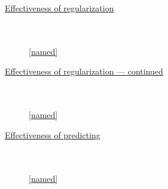 \documentclass{beamer}
\begin{document}
\begin{frame}[plain]
		\centering
		\underline{Effectiveness of regularization}
		\vspace{-1cm}
\begin{figure}[!t]
  \captionsetup[subfloat]{position=top,labelformat=empty}
  \centering
    \subfloat[]{  \resizebox{0.4\textwidth}{!}{}}
    \subfloat[]{  \resizebox{0.4\textwidth}{!}{}}\\
  \vspace{-1cm}
    \subfloat[]{  \resizebox{0.4\textwidth}{!}{}}
    \subfloat[]{  \resizebox{0.4\textwidth}{!}{}}\\
    \ref{named}
\end{figure}
\end{frame}


\begin{frame}[plain]
		\centering
		\underline{Effectiveness of regularization --- continued}
		\vspace{-1cm}
\begin{figure}[!t]
  \captionsetup[subfloat]{position=top,labelformat=empty}
  \centering
    \subfloat[]{  \resizebox{0.4\textwidth}{!}{}}
    \subfloat[]{  \resizebox{0.4\textwidth}{!}{}}\\
  \vspace{-1cm}
    \subfloat[]{  \resizebox{0.4\textwidth}{!}{}}
  \\
    \ref{named}
\end{figure}
\end{frame}


\begin{frame}[plain]
		\centering
		\underline{Effectiveness of predicting}
		\vspace{-1cm}
\begin{figure}[!t]
  \captionsetup[subfloat]{position=top,labelformat=empty}
  \centering
    \subfloat[]{  \resizebox{0.4\textwidth}{!}{}}
    \subfloat[]{  \resizebox{0.4\textwidth}{!}{}}\\
  \vspace{-1cm}
    \subfloat[]{  \resizebox{0.4\textwidth}{!}{}}
    \subfloat[]{  \resizebox{0.4\textwidth}{!}{}}\\
    \ref{named}
\end{figure}
\end{frame}
\end{document}
